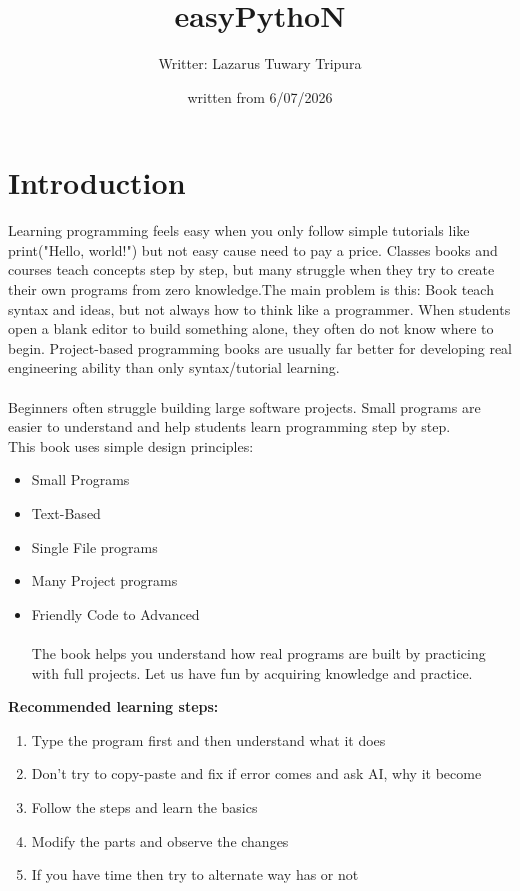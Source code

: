 \documentclass{book}
\title{easyPythoN}
\author{Writter: Lazarus Tuwary Tripura}
\date{written from 6/07/2026 }
\begin{document}
\maketitle

\section*{Introduction}
Learning programming feels easy when you only follow simple tutorials like print("Hello, world!") but not easy cause need to pay a price. Classes books and courses teach concepts step by step, but many struggle when they try to create their own programs from zero knowledge.The main problem is this: Book teach syntax and ideas, but not always how to think like a programmer. When students open a blank editor to build something alone, they often do not know where to begin. Project-based programming books are usually far better for developing real engineering ability than only syntax/tutorial learning.\\
\\ Beginners often struggle building large software projects. Small programs are easier to understand and help students learn programming step by step.\\
This book uses simple design principles:
\begin{itemize}
    \item Small Programs
    \item Text-Based
    \item Single File programs
    \item Many Project programs
    \item Friendly Code to Advanced\\\\
The book helps you understand how real programs are built by practicing with full projects. Let us have fun by acquiring knowledge and practice.
\end{itemize}
\textbf{Recommended learning steps:}
\begin{enumerate}
    \item Type the program first and then understand what it does
    \item Don't try to copy-paste and fix if error comes and ask AI, why it become
    \item Follow the steps and learn the basics
    \item Modify the parts and observe the changes
    \item If you have time then try to alternate way has or not
\end{enumerate}
\end{document}
